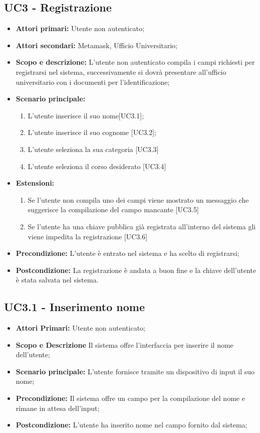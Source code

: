 \documentclass[AnalisiDeiRequisiti.tex]{subfiles}
\begin{document}
\subsection{UC3 - Registrazione}
\begin{itemize}
	\item \textbf{Attori primari:} Utente non autenticato;\\
	\item \textbf{Attori secondari:} Metamask, Ufficio Universitario;
	\item \textbf{Scopo e descrizione:} L'utente non autenticato compila i campi richiesti per registrarsi nel sistema, successivamente si dovrà presentare all'ufficio universitario con i documenti per l'identificazione;\\
	\item \textbf{Scenario principale:}
	\begin{enumerate}
		\item L'utente inserisce il suo nome[UC3.1];
		\item L'utente inserisce il suo cognome [UC3.2];
		\item L'utente seleziona la sua categoria [UC3.3]
		\item L'utente seleziona il corso desiderato [UC3.4]
	\end{enumerate}
	\item \textbf{Estensioni:}
	\begin{enumerate}
		\item Se l'utente non compila uno dei campi viene mostrato un messaggio che suggerisce la compilazione del campo mancante [UC3.5]
		\item Se l'utente ha una chiave pubblica già registrata  all'interno del sistema gli viene impedita la registrazione [UC3.6]
	\end{enumerate}
	\item \textbf{Precondizione:} L'utente è entrato nel sistema e ha scelto di registrarsi;\\
	\item \textbf{Postcondizione:} La registrazione è andata a buon fine e la chiave dell'utente è stata salvata nel sistema.\\
\end{itemize}
\subsection{UC3.1 - Inserimento nome}
\begin{itemize}
	\item \textbf{Attori Primari:} Utente non autenticato;
	\item \textbf{Scopo e Descrizione} Il sistema offre l'interfaccia per inserire il nome dell'utente;
	\item \textbf{Scenario principale:} L'utente fornisce tramite un dispositivo di input il suo nome;
	\item \textbf{Precondizione:} Il sistema offre un campo per la compilazione del nome e rimane in attesa dell'input;
	\item \textbf{Postcondizione:} L'utente ha inserito nome nel campo fornito dal sistema;
\end{itemize}	
\end{document}
